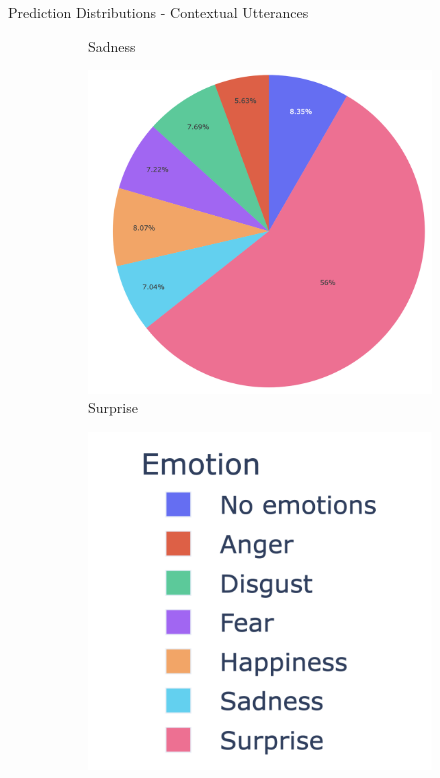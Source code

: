 \documentclass[11pt,aspectratio=169]{beamer}
\begin{document}
\begin{frame}{Prediction Distributions - Contextual Utterances}
\begin{figure}[!ht]
\begin{subfigure}{0.19\textwidth}
      \caption*{Sadness}
    \end{subfigure}\hfil 
    \begin{subfigure}{0.19\textwidth}
      \includegraphics[width=\linewidth]{figures/surprise_context.png}
      \caption*{Surprise}
    \end{subfigure}\hfil
    \begin{subfigure}{0.19\textwidth}
      \includegraphics[width=\linewidth]{figures/legend.png}
      \caption*{}
    \end{subfigure}
    \label{fig:pred_distrib_context}
    \end{figure}
    \end{frame}
    
\end{document}

